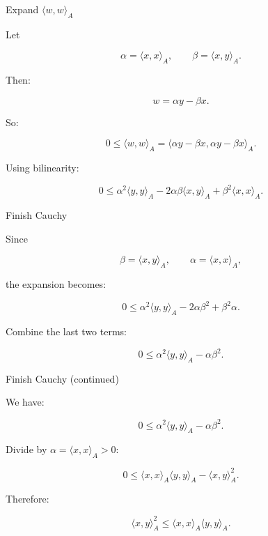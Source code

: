 \documentclass[10pt]{beamer}
\theoremstyle{definition}
\begin{document}
\begin{frame}{Expand $\langle w,w\rangle_A$}

Let

$$
\alpha=\langle x,x\rangle_A,
\qquad
\beta=\langle x,y\rangle_A.
$$

\vfill

Then:

$$
w=\alpha y-\beta x.
$$

\vfill

So:

$$
0\le\langle w,w\rangle_A
=\langle \alpha y-\beta x,\alpha y-\beta x\rangle_A.
$$

\vfill

Using bilinearity:

$$
0\le \alpha^2\langle y,y\rangle_A-2\alpha\beta\langle x,y\rangle_A+\beta^2\langle x,x\rangle_A.
$$

\end{frame}


\begin{frame}{Finish Cauchy}

Since

$$
\beta=\langle x,y\rangle_A,
\qquad
\alpha=\langle x,x\rangle_A,
$$

the expansion becomes:

$$
0\le
\alpha^2\langle y,y\rangle_A
-2\alpha\beta^2
+\beta^2\alpha.
$$

\vfill

Combine the last two terms:

$$
0\le
\alpha^2\langle y,y\rangle_A-\alpha\beta^2.
$$

\end{frame}


\begin{frame}{Finish Cauchy (continued)}

We have:

$$
0\le
\alpha^2\langle y,y\rangle_A-\alpha\beta^2.
$$

\vfill

Divide by $\alpha=\langle x,x\rangle_A>0$:

$$
0\le \langle x,x\rangle_A\langle y,y\rangle_A-\langle x,y\rangle_A^2.
$$

\vfill

Therefore:

$$
\boxed{
\langle x,y\rangle_A^2
\le
\langle x,x\rangle_A\langle y,y\rangle_A.
}
$$

\end{frame}
\end{document}
